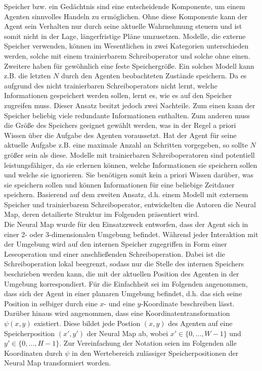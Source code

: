 Speicher bzw. ein Gedächtnis sind eine entscheidende Komponente, um einem Agenten sinnvolles Handeln zu ermöglichen. Ohne diese Komponente kann der Agent sein Verhalten nur durch seine aktuelle Wahrnehmung steuern und ist somit nicht in der Lage, längerfristige Pläne umzusetzen. Modelle, die externe Speicher verwenden, können im Wesentlichen in zwei Kategorien unterschieden werden, solche mit einem trainierbarem Schreiboperator und solche ohne einen. Zweitere haben für gewöhnlich eine feste Speichergröße. Ein solches Modell kann z.B. die letzten $N$ durch den Agenten beobachteten Zustände speichern. Da es aufgrund des nicht trainierbaren Schreiboperators nicht lernt, welche Informationen gespeichert werden sollen, lernt es, wie es auf den Speicher zugreifen muss. Dieser Ansatz besitzt jedoch zwei Nachteile. Zum einen kann der Speicher beliebig viele redundante Informationen enthalten. Zum anderen muss die Größe des Speichers geeignet gewählt werden, was in der Regel a priori Wissen über die Aufgabe des Agenten voraussetzt. Hat der Agent für seine aktuelle Aufgabe z.B. eine maximale Anzahl an Schritten vorgegeben, so sollte $N$ größer sein als diese. Modelle mit trainierbaren Schreiboperatoren sind potentiell leistungsfähiger, da sie erlernen können, welche Informationen sie speichern sollen und welche sie ignorieren. Sie benötigen somit kein a priori Wissen darüber, was sie speichern sollen und können Informationen für eine beliebige Zeitdauer speichern. Basierend auf dem zweiten Ansatz, d.h. einem Modell mit externem Speicher und trainierbarem Schreiboperator, entwickelten die Autoren die Neural Map, deren detailierte Struktur im Folgenden präsentiert wird. \\

Die Neural Map wurde für den Einsatzzweck entworfen, dass der Agent sich in einer 2- oder 3-dimensionalen Umgebung befindet. Während jeder Interaktion mit der Umgebung wird auf den internen Speicher zugegriffen in Form einer Leseoperation und einer anschließenden Schreiboperation. Dabei ist die Schreiboperation lokal beegrenzt, sodass nur die Stelle des internen Speichers beschrieben werden kann, die mit der aktuellen Position des Agenten in der Umgebung korrespondiert. Für die Einfachheit sei im Folgenden angenommen, dass sich der Agent in einer planaren Umgebung befindet, d.h. das sich seine Position in selbiger durch eine $x$- und eine $y$-Koordinate beschreiben lässt. Darüber hinaus wird angenommen, dass eine Koordinatentransformation $\psi(x,y)$ existiert. Diese bildet jede Postion $(x,y)$ des Agenten auf eine Speicherposition $(x',y')$ der Neural Map ab, wobei $x' \in \{0, \dots, W-1\}$ und $y' \in \{0, \dots, H-1\}$. Zur Vereinfachung der Notation seien im Folgenden alle Koordinaten durch $\psi$ in den Wertebereich zulässiger Speicherpositionen der Neural Map transformiert worden. \\

